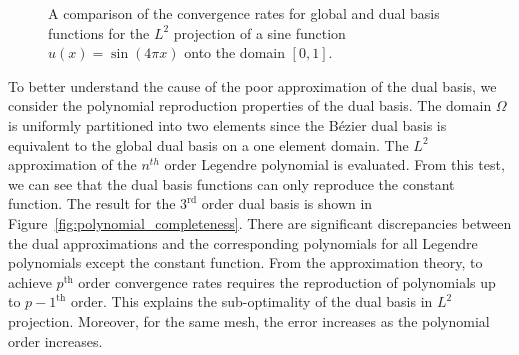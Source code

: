 \begin{figure}[ht]
	\center
	
	\caption{A comparison of the convergence rates for global and \Bezier dual basis functions for the $L^2$ projection of a sine function $u(x)=\sin (4\pi x)$ onto the domain $\left[ 0, 1\right]$.}
	\label{fig:l_2_error}
\end{figure}

To better understand the cause of the poor approximation of the \Bezier dual basis, we consider the polynomial reproduction properties of the \Bezier dual basis. The domain $\Omega$ is uniformly partitioned into two elements since the B\'ezier dual basis is equivalent to the global dual basis on a one element domain. The $L^2$ approximation of the $n^{th}$ order Legendre polynomial is evaluated. From this test, we can see that the \Bezier dual basis functions can only reproduce the constant function. The result for the $3^\text{rd}$ order \Bezier dual basis is shown in Figure~\ref{fig:polynomial_completeness}. There are significant discrepancies between the dual approximations and the corresponding polynomials for all Legendre polynomials except the constant function. From the approximation theory, to achieve $p^\text{th}$ order convergence rates requires the reproduction of polynomials up to $p-1^\text{th}$ order. This explains the sub-optimality of the \Bezier dual basis in $L^2$ projection. Moreover, for the same mesh, the error increases as the polynomial order increases.\par

